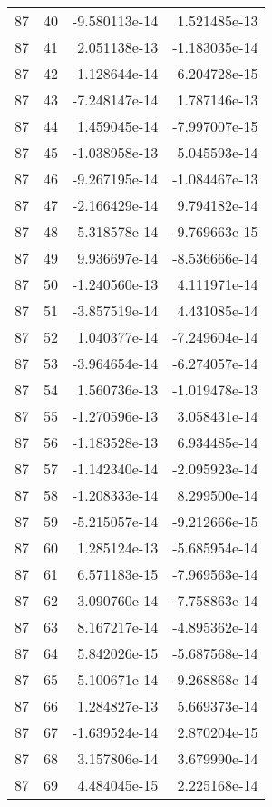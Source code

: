 \begin{tabular}{rrrr}
  87 &   40 & -9.580113e-14 &  1.521485e-13 \\
  87 &   41 &  2.051138e-13 & -1.183035e-14 \\
  87 &   42 &  1.128644e-14 &  6.204728e-15 \\
  87 &   43 & -7.248147e-14 &  1.787146e-13 \\
  87 &   44 &  1.459045e-14 & -7.997007e-15 \\
  87 &   45 & -1.038958e-13 &  5.045593e-14 \\
  87 &   46 & -9.267195e-14 & -1.084467e-13 \\
  87 &   47 & -2.166429e-14 &  9.794182e-14 \\
  87 &   48 & -5.318578e-14 & -9.769663e-15 \\
  87 &   49 &  9.936697e-14 & -8.536666e-14 \\
  87 &   50 & -1.240560e-13 &  4.111971e-14 \\
  87 &   51 & -3.857519e-14 &  4.431085e-14 \\
  87 &   52 &  1.040377e-14 & -7.249604e-14 \\
  87 &   53 & -3.964654e-14 & -6.274057e-14 \\
  87 &   54 &  1.560736e-13 & -1.019478e-13 \\
  87 &   55 & -1.270596e-13 &  3.058431e-14 \\
  87 &   56 & -1.183528e-13 &  6.934485e-14 \\
  87 &   57 & -1.142340e-14 & -2.095923e-14 \\
  87 &   58 & -1.208333e-14 &  8.299500e-14 \\
  87 &   59 & -5.215057e-14 & -9.212666e-15 \\
  87 &   60 &  1.285124e-13 & -5.685954e-14 \\
  87 &   61 &  6.571183e-15 & -7.969563e-14 \\
  87 &   62 &  3.090760e-14 & -7.758863e-14 \\
  87 &   63 &  8.167217e-14 & -4.895362e-14 \\
  87 &   64 &  5.842026e-15 & -5.687568e-14 \\
  87 &   65 &  5.100671e-14 & -9.268868e-14 \\
  87 &   66 &  1.284827e-13 &  5.669373e-14 \\
  87 &   67 & -1.639524e-14 &  2.870204e-15 \\
  87 &   68 &  3.157806e-14 &  3.679990e-14 \\
  87 &   69 &  4.484045e-15 &  2.225168e-14 \\

\end{tabular}
